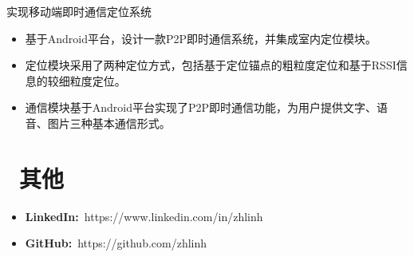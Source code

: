 \documentclass{resume}
\begin{document}
\setlength{\parindent}{2em}实现移动端即时通信定位系统
\begin{onehalfspacing}
\begin{itemize}[leftmargin=5em]
  \item 基于Android平台，设计一款P2P即时通信系统，并集成室内定位模块。
  \item 定位模块采用了两种定位方式，包括基于定位锚点的粗粒度定位和基于RSSI信息的较细粒度定位。
  \item 通信模块基于Android平台实现了P2P即时通信功能，为用户提供文字、语音、图片三种基本通信形式。
\end{itemize}
\end{onehalfspacing}


\section{\faInfo\ 其他}
\begin{itemize}[parsep=0.5ex]
  \item \textbf{LinkedIn:}\ https://www.linkedin.com/in/zhlinh
  \item \textbf{GitHub:}\ https://github.com/zhlinh
\end{itemize}

%
%
\end{document}
